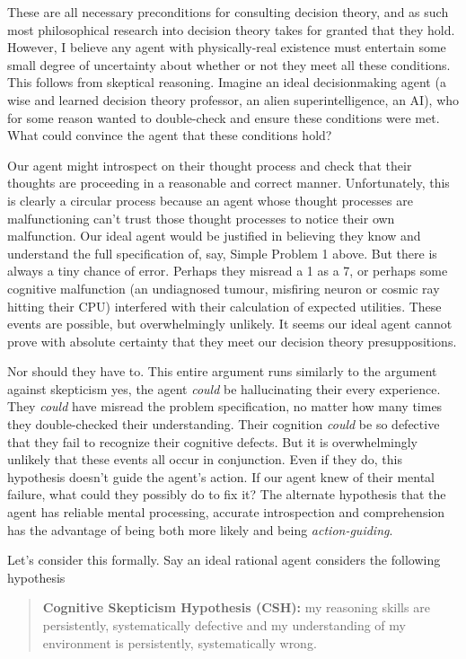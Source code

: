 \documentclass{article}
\begin{document}
These are all necessary preconditions for consulting decision theory, and as such most philosophical research into decision theory takes for granted that they hold. However, I believe any agent with physically-real existence must entertain some small degree of uncertainty about whether or not they meet all these conditions. This follows from skeptical reasoning. Imagine an ideal decisionmaking agent (a wise and learned decision theory professor, an alien superintelligence, an AI), who for some reason wanted to double-check and ensure these conditions were met. What could convince the agent that these conditions hold?

Our agent might introspect on their thought process and check that their thoughts are proceeding in a reasonable and correct manner. Unfortunately, this is clearly a circular process because an agent whose thought processes are malfunctioning can't trust those thought processes to notice their own malfunction. Our ideal agent would be justified in believing they know and understand the full specification of, say, Simple Problem 1 above. But there is always a tiny chance of error. Perhaps they misread a 1 as a 7, or perhaps some cognitive malfunction (an undiagnosed tumour, misfiring neuron or cosmic ray hitting their CPU) interfered with their calculation of expected utilities. These events are possible, but overwhelmingly unlikely. It seems our ideal agent cannot prove with absolute certainty that they meet our decision theory presuppositions.

Nor should they have to. This entire argument runs similarly to the argument against skepticism \textemdash{} yes, the agent \textit{could} be hallucinating their every experience. They \textit{could} have misread the problem specification, no matter how many times they double-checked their understanding. Their cognition \textit{could} be so defective that they fail to recognize their cognitive defects. But it is overwhelmingly unlikely that these events all occur in conjunction. Even if they do, this hypothesis doesn't guide the agent's action. If our agent knew of their mental failure, what could they possibly do to fix it? The alternate hypothesis \textemdash{} that the agent has reliable mental processing, accurate introspection and comprehension \textemdash{} has the advantage of being both more likely and being \textit{action-guiding}. 

Let's consider this formally. Say an ideal rational agent considers the following hypothesis

\begin{quote}
\textbf{Cognitive Skepticism Hypothesis (CSH):} my reasoning skills are persistently, systematically defective and my understanding of my environment is persistently, systematically wrong.
\end{quote}
\end{document}
